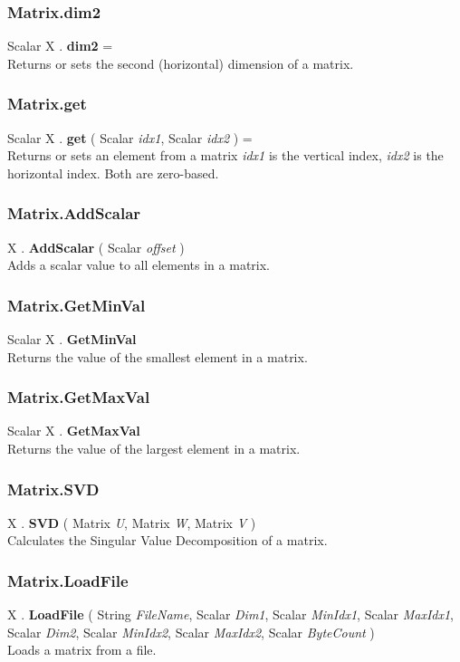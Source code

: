 \documentclass[10pt]{book}
\newcommand{\var}[1]{\textit{#1}}
\begin{document}
\subsubsection{Matrix.dim2 \label{F:Matrix:dim2}}
Scalar X . \textbf{dim2} = \\
Returns or sets the second (horizontal) dimension of a matrix.


\subsubsection{Matrix.get \label{F:Matrix:get}}
Scalar X . \textbf{get} ( Scalar \textit{idx1}, Scalar \textit{idx2} ) = \\
Returns or sets an element from a matrix \var{idx1} is the vertical index, \var{idx2} is the horizontal index. Both are zero-based.

\subsubsection{Matrix.AddScalar \label{F:Matrix:AddScalar}}
X . \textbf{AddScalar} ( Scalar \textit{offset} ) \\
Adds a scalar value to all elements in a matrix.

\subsubsection{Matrix.GetMinVal \label{F:Matrix:GetMinVal}}
Scalar X . \textbf{GetMinVal} \\
Returns the value of the smallest element in a matrix.

\subsubsection{Matrix.GetMaxVal \label{F:Matrix:GetMaxVal}}
Scalar X . \textbf{GetMaxVal} \\
Returns the value of the largest element in a matrix.


\subsubsection{Matrix.SVD \label{F:Matrix:SVD}}
X . \textbf{SVD} ( Matrix \textit{U}, Matrix \textit{W}, Matrix \textit{V} ) \\
Calculates the Singular Value Decomposition of a matrix.

\subsubsection{Matrix.LoadFile \label{F:Matrix:LoadFile}}
X . \textbf{LoadFile} ( String \textit{FileName}, Scalar \textit{Dim1}, Scalar \textit{MinIdx1}, Scalar \textit{MaxIdx1}, Scalar \textit{Dim2}, Scalar \textit{MinIdx2}, Scalar \textit{MaxIdx2}, Scalar \textit{ByteCount} ) \\
Loads a matrix from a file.
\end{document}

